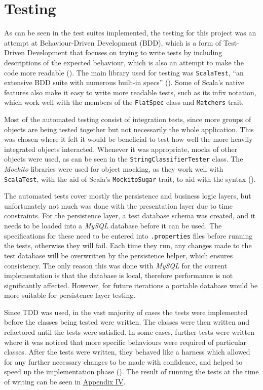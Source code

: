 \section{Testing} \label{sec:Testing}

As can be seen in the test suites implemented, the testing for this project was
an attempt at Behaviour-Driven Development (BDD), which is a form of
Test-Driven Development that focuses on trying to write tests by including
descriptions of the expected behaviour, which is also an attempt to make the
code more readable (\cite[][Ch.~1]{wynne2017cucumber}). The main library used
for testing was \texttt{ScalaTest}, ``an extensive BDD suite with numerous
built-in specs'' (\cite[][p.~21]{hinojosa2013testing}). Some of Scala's native
features also make it easy to write more readable tests, such as its infix
notation, which work well with the members of the \texttt{FlatSpec} class and
\texttt{Matchers} trait.

Most of the automated testing consist of integration tests, since more groups
of objects are being tested together but not necessarily the whole application.
This was chosen where it felt it would be beneficial to test how well the more
heavily integrated objects interacted. Whenever it was appropriate, mocks of
other objects were used, as can be seen in the \texttt{StringClassifierTester}
class. The \emph{Mockito} libraries were used for object mocking, as they work
well with \texttt{ScalaTest}, with the aid of Scala's \texttt{MockitoSugar}
trait, to aid with the syntax (\cite[][pp.~102-106]{hinojosa2013testing}).

The automated tests cover mostly the persistence and business logic layers, but
unfortunately not much was done with the presentation layer due to time
constraints. For the persistence layer, a test database schema was created, and
it needs to be loaded into a \emph{MySQL} database before it can be used. The
specifications for these need to be entered into \texttt{.properties} files
before running the tests, otherwise they will fail. Each time they run, any
changes made to the test database will be overwritten by the persistence
helper, which ensures consistency. The only reason this was done with
\emph{MySQL} for the current implementation is that the database is local,
therefore performance is not significantly affected. However, for future
iterations a portable database would be more suitable for persistence layer
testing.

Since TDD was used, in the vast majority of cases the tests were implemented
before the classes being tested were written. The classes were then written and
refactored until the tests were satisfied. In some cases, further tests were
written where it was noticed that more specific behaviours were required of
particular classes. After the tests were written, they behaved like a harness
which allowed for any further necessary changes to be made with confidence, and
helped to speed up the implementation phase
(\cite[][pp.~x-xi]{hinojosa2013testing}). The result of running the tests at
the time of writing can be seen in \hyperref[appendix4]{Appendix IV}.


